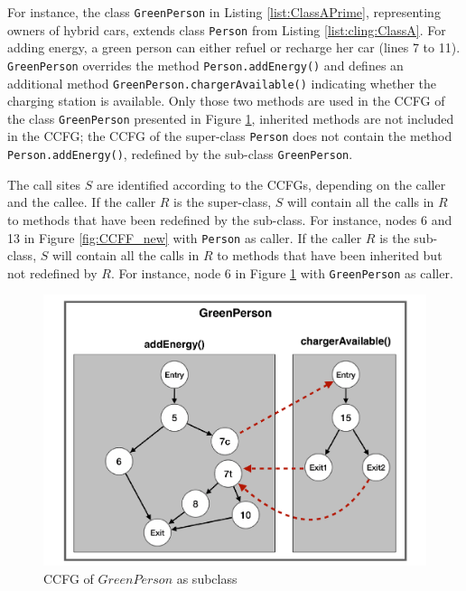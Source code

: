 For instance, the class \texttt{GreenPerson} in Listing \ref{list:ClassAPrime}, representing owners of hybrid cars, extends class \texttt{Person} from Listing \ref{list:cling:ClassA}. For adding energy, a green person can either refuel or recharge her car (lines 7 to 11). \texttt{Green\-Person} overrides the method \texttt{Person.add\-En\-er\-gy()} and defines an additional method \texttt{Green\-Person.char\-ger\-Avai\-la\-ble()} indicating whether the charging station is available. Only those two methods are used in the CCFG of the class \texttt{Green\-Person} presented in Figure \ref{fig:greenPersonCCFG}, inherited methods are not included in the CCFG; the CCFG of the super-class \texttt{Person} does not contain the method \texttt{Person.addEnergy()}, redefined by the sub-class \texttt{GreenPerson}.

The call sites $S$ are identified according to the CCFGs, depending on the caller and the callee. If the caller $R$ is the super-class, $S$ will contain all the calls in $R$ to methods that have been redefined by the sub-class. For instance, nodes 6 and 13 in Figure \ref{fig:CCFF_new} with \texttt{Person} as caller. If the caller $R$ is the sub-class, $S$ will contain all the calls in $R$ to methods that have been inherited but not redefined by $R$. For instance, node 6 in Figure \ref{fig:greenPersonCCFG} with \texttt{GreenPerson} as caller.

\begin{figure}[!t]
    \centering
  \includegraphics[width=0.65\linewidth, angle=-90]{papers/cling/figures/GreenPerson2}
\caption{CCFG of $GreenPerson$ as subclass}
\label{fig:greenPersonCCFG}
\end{figure}
 

